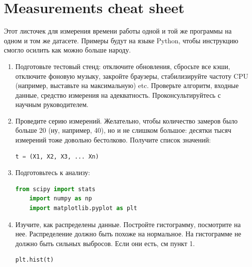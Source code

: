 \documentclass{article}
\title{}
\author{}
\begin{document}

\section*{Measurements cheat sheet}

Этот листочек для измерения времени работы одной и той же программы на одном и том же датасете. Примеры будут на языке Python, чтобы инструкцию смогло осилить как можно больше народу.

\begin {enumerate}

\item Подготовьте тестовый стенд: отключите обновления, сбросьте все кэши, отключите фоновую музыку, закройте браузеры, стабилизируйте частоту CPU (например, выставьте на максимальную) etc. Проверьте алгоритм, входные данные, средство измерения на адекватность. Проконсультируйтесь с научным руководителем.

\item Проведите серию измерений. Желательно, чтобы количество замеров было больше 20 (ну, например, 40), но и не слишком большое: десятки тысяч измерений тоже довольно бестолково. Получите список значений:
\begin{lstlisting}[language=Python]
	t = (X1, X2, X3, ... Xn)
\end{lstlisting}

\item Подготовьтесь к анализу:
\begin{lstlisting}[language=Python]
	from scipy import stats
	import numpy as np
	import matplotlib.pyplot as plt
\end{lstlisting}

\item Изучите, как распределены данные. Постройте гистограмму, посмотрите на нее. Распределение должно быть похоже на нормальное. На гистограмме не должно быть сильных выбросов. Если они есть, см пункт 1.
\begin{lstlisting}[language=Python]
	plt.hist(t)
\end{lstlisting}


\end{enumerate}
\end{document}
